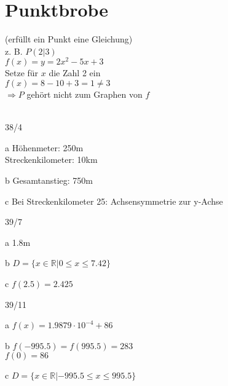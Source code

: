\section{Punktbrobe}
(erfüllt ein Punkt eine Gleichung) \\
z. B. $P(2|3)$ \\
$f(x) = y = 2x^2 - 5x + 3$ \\
Setze für $x$ die Zahl 2 ein \\
$f(x) = 8 - 10 + 3 = 1 \neq 3$ \\
$\Rightarrow P$ gehört nicht zum Graphen von $f$ \\\\
\begin{exercise}{38/4}
  \item [a]
  Höhenmeter: 250m \\
  Streckenkilometer: 10km
  \item [b]
  Gesamtanstieg: 750m
  \item [c]
  Bei Streckenkilometer 25: Achsensymmetrie zur y-Achse
\end{exercise}
\begin{exercise}{39/7}
  \item [a]
  1.8m
  \item [b]
  $D = \{x \in \mathbb{R} | 0 \leq x \leq 7.42\}$
  \item [c]
  $f(2.5) = 2.425$
\end{exercise}
\begin{exercise}{39/11}
  \item [a]
  $f(x) = 1.9879 \cdot 10^{-4} + 86$
  \item [b]
  $f(-995.5) = f(995.5) = 283$ \\
  $f(0) = 86$
  \item [c]
  $D = \{x \in \mathbb{R} | -995.5 \leq x \leq 995.5\}$
\end{exercise}
